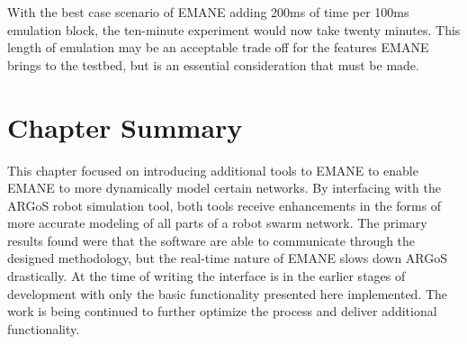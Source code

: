 With the best case scenario of EMANE adding 200ms of time per 100ms emulation block, the ten-minute experiment would now take twenty minutes.
This length of emulation may be an acceptable trade off for the features EMANE brings to the testbed, but is an essential consideration that must be made.

\section{Chapter Summary}
This chapter focused on introducing additional tools to EMANE to enable EMANE to more dynamically model certain networks.
By interfacing with the ARGoS robot simulation tool, both tools receive enhancements in the forms of more accurate modeling of all parts of a robot swarm network.
The primary results found were that the software are able to communicate through the designed methodology, but the real-time nature of EMANE slows down ARGoS drastically.
At the time of writing the interface is in the earlier stages of development with only the basic functionality presented here implemented.
The work is being continued to further optimize the process and deliver additional functionality.
